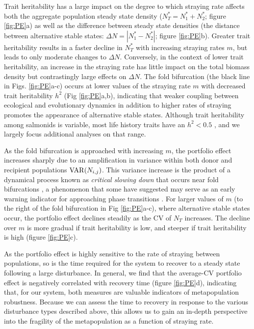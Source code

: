 \documentclass[twocolumn,preprintnumbers,amsmath,amssymb,superscriptaddress]{revtex4}
\begin{document}
Trait heritability has a large impact on the degree to which straying rate affects both the aggregate population steady state density ($N^*_T=N^*_1+N^*_2$; figure \ref{fig:PE}a) as well as the difference between steady state densities (the distance between alternative stable states: $\Delta N=|N^*_1-N^*_2|$; figure \ref{fig:PE}b).
Greater trait heritability results in a faster decline in $N_T^*$ with increasing straying rates $m$, but leads to only moderate changes to $\Delta N$.
Conversely, in the context of lower trait heritability, an increase in the straying rate has little impact on the total biomass density but contrastingly large effects on $\Delta N$.
The fold bifurcation (the black line in Figs. \ref{fig:PE}a-c) occurs at lower values of the straying rate $m$ with decreased trait heritability $h^2$ (Fig \ref{fig:PE}a,b), indicating that weaker coupling between ecological and evolutionary dynamics in addition to higher rates of straying promotes the appearance of alternative stable states.
Although trait heritability among salmonids is variable, most life history traits have an $h^2 <0.5$ \cite{Carlson:2008hl}, and we largely focus additional analyses on that range.

As the fold bifurcation is approached with increasing $m$, the portfolio effect increases sharply due to an amplification in variance within both donor and recipient populations ${\rm VAR}(N_{i,j})$.
This variance increase is the product of a dynamical process known as \emph{critical slowing down} that occurs near fold bifurcations \cite{Scheffer:2009gg}, a phenomenon that some have suggested may serve as an early warning indicator for approaching phase transitions \cite{Scheffer:2009gg,Lade:2012eu,Anonymous:2013br,Dakos:2014br}.
For larger values of $m$ (to the right of the fold bifurcation in Fig \ref{fig:PE}a-c), where alternative stable states occur, the portfolio effect declines steadily as the CV of $N_T$ increases.
The decline over $m$ is more gradual if trait heritability is low, and steeper if trait heritability is high (figure \ref{fig:PE}c).

As the portfolio effect is highly sensitive to the rate of straying between populations, so is the time required for the system to recover to a steady state following a large disturbance.
In general, we find that the average-CV portfolio effect is negatively correlated with recovery time (figure \ref{fig:PE}d), indicating that, for our system, both measures are valuable indicators of metapopulation robustness.
Because we can assess the time to recovery in response to the various disturbance types described above, this allows us to gain an in-depth perspective into the fragility of the metapopulation as a function of straying rate.
\end{document}
